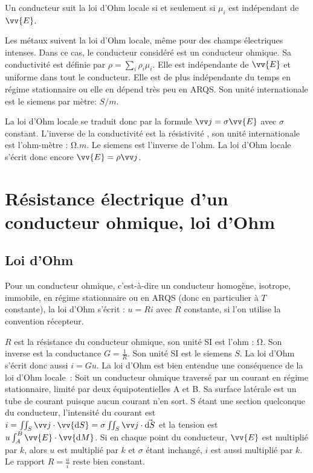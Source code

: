 Un conducteur suit la  loi d'Ohm locale si et seulement si \(\mu_i\)  est 
indépendant de \(\vv{E}\).

Les métaux suivent la loi d'Ohm locale, même pour des champs électriques 
intenses. Dans ce cas, le conducteur considéré est un conducteur ohmique. Sa 
conductivité est définie par \(\rho = \sum_i \rho_i \mu_i\). Elle est 
indépendante de \(\vv{E}\) et uniforme dans tout le conducteur. Elle est de 
plus indépendante du temps en régime stationnaire ou elle en dépend très peu en 
ARQS\@. Son unité internationale est le siemens par mètre: \(\si{S/m}\).

La loi d'Ohm locale se traduit donc par la formule \(\vj = \sigma \vv{E}\) avec 
\(\sigma\) constant. L'inverse de la conductivité est la résistivité , son 
unité internationale est l'ohm-mètre : \(\si{\ohm.m}\). Le siemens est 
l'inverse de l'ohm. La loi d'Ohm locale s'écrit donc encore \(\vv{E} = \rho 
\vj\).

\section{Résistance électrique d'un conducteur ohmique, loi d'Ohm}%
\label{chap10-sec:resistanceelectrique}%

\subsection{Loi d'Ohm}%
\label{chap10-subsec:loidohm}%

Pour un conducteur ohmique, c'est-à-dire un conducteur homogène, isotrope, 
immobile, en régime stationnaire ou en ARQS (donc en particulier à \(T\) 
constante), la loi d'Ohm s'écrit : \(u = R i\) avec \(R\) constante, si l'on 
utilise la convention récepteur.

\(R\) est la résistance du conducteur ohmique, son unité SI est l'ohm : 
\(\si{\ohm}\). Son inverse est la conductance \(G=\frac{1}{R}\). Son unité SI 
est le siemens \(\si{S}\). La loi d'Ohm s'écrit donc aussi \(i = G u\). La loi 
d'Ohm est bien entendue une conséquence de la loi d'Ohm locale~: Soit un 
conducteur ohmique traversé par un courant en régime stationnaire, limité par 
deux équipotentielles A et B. Sa surface latérale est un tube de courant 
puisque aucun courant n'en sort. S étant une section quelconque du conducteur, 
l'intensité du courant est \( i = \iint_{S} \vj \cdot \vv{\D S} = \sigma 
\iint_S \vj \cdot \vec{\D S}\) et la tension est \(u \int_A^B \vv{E} \cdot 
\vv{\D M}\). Si en chaque point du conducteur, \(\vv{E}\) est multiplié par 
\(k\), alors \(u\) est multiplié par \(k\) et \(\sigma\) étant inchangé, \(i\) 
est aussi multiplié par \(k\). Le rapport \(R = \frac{u}{i}\) reste bien 
constant.

